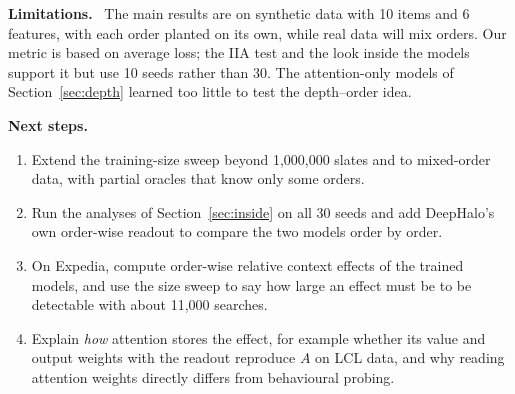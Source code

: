 \documentclass[11pt,a4paper]{article}
\numberwithin{table}{section}
\numberwithin{figure}{section}
\numberwithin{equation}{section}
\newcommand{\para}[1]{\textbf{#1}\ }
\begin{document}
\para{Limitations.} The main results are on synthetic data with 10 items and 6 features, with each order planted on its own, while real data will mix orders. Our metric is based on average loss; the IIA test and the look inside the models support it but use 10 seeds rather than 30. The attention-only models of Section~\ref{sec:depth} learned too little to test the depth--order idea.

\para{Next steps.}
\begin{enumerate}
\item Extend the training-size sweep beyond 1,000,000 slates and to mixed-order data, with partial oracles that know only some orders.
\item Run the analyses of Section~\ref{sec:inside} on all 30 seeds and add DeepHalo's own order-wise readout to compare the two models order by order.
\item On Expedia, compute order-wise relative context effects of the trained models, and use the size sweep to say how large an effect must be to be detectable with about 11,000 searches.
\item Explain \emph{how} attention stores the effect, for example whether its value and output weights with the readout reproduce $A$ on LCL data, and why reading attention weights directly differs from behavioural probing.
\end{enumerate}

\end{document}
